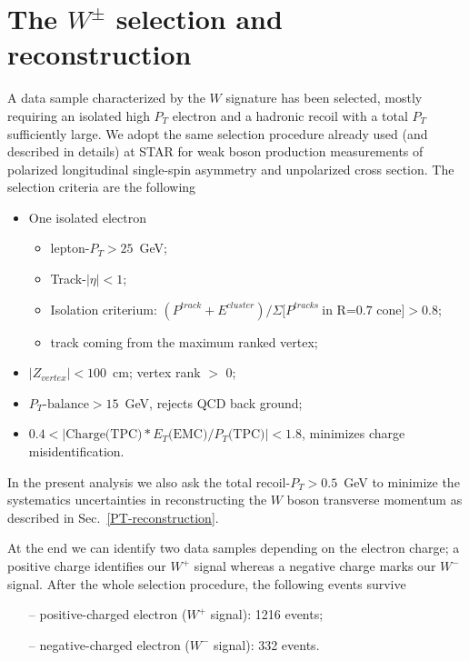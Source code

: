 \documentclass[12pt]{article}
\begin{document}


\section{The $W^{\pm}$ selection and reconstruction}
\label{Wselection}
A data sample characterized by the $W$ signature has been selected, mostly requiring an isolated high $P_{T}$ electron and a hadronic recoil with a total $P_{T}$ sufficiently large. We adopt the same selection procedure already used (and described in details) at STAR for weak boson production measurements of polarized longitudinal single-spin asymmetry\cite{STAR_W_AL_2009-paper, STAR_W_AL_2009-note, STAR_W_AL_2012-paper, STAR_W_AL_2012-note} and unpolarized cross section\cite{STAR_W_xSec_2009-paper,STAR_W_xSec_2009-note}. The selection criteria are the following

\begin{itemize}
\item One isolated electron
    \begin{itemize}
    \item lepton-$P_{T}>25$~GeV;
    \item Track-$|\eta|<1$;
    \item Isolation criterium: $(P^{track}+E^{cluster})/\Sigma[P^{tracks}~\text{in R=0.7 cone]} > 0.8$;
    \item track coming from the maximum ranked vertex;
    \end{itemize}
\item $|Z_{vertex}| < 100$~cm; vertex rank $>$ 0;    
\item $P_{T}\text{-balance} > 15$~GeV, rejects QCD back ground;
\item $0.4 < |\text{Charge(TPC)}*E_{T}\text{(EMC)}/P_{T}\text{(TPC)}| < 1.8$, minimizes charge misidentification.
\end{itemize}

In the present analysis we also ask the total recoil-$P_{T} > 0.5$~GeV to minimize the systematics uncertainties in reconstructing the $W$ boson transverse momentum as described in Sec.~\ref{PT-reconstruction}.

At the end we can identify two data samples depending on the electron charge; a positive charge identifies our $W^{+}$ signal whereas a negative charge marks our $W^{-}$ signal. After the whole selection procedure, the following events survive
\begin{itemize}
\item[--] positive-charged electron ($W^{+}$ signal): 1216 events;
\item[--] negative-charged electron ($W^{-}$ signal): 332 events.
\end{itemize}
\end{document}
